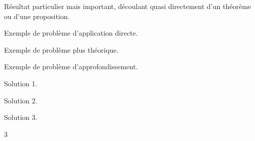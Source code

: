 \begin{corollaire*}
	Résultat particulier mais important, découlant quasi directement d'un théorème ou d'une proposition.
\end{corollaire*}

\begin{Exercise}[label=1, counter=preface]
	Exemple de problème d'application directe.
\end{Exercise}
\begin{Exercise}[difficulty=1, label=2, counter=preface]
	Exemple de problème plus théorique.
\end{Exercise}
\begin{Exercise}[difficulty=2, label=3, counter=preface]
	Exemple de problème d'approfondissement.
\end{Exercise}
\shipoutExercise
\begin{Answer}[ref=1]
	Solution 1.
\end{Answer}
\begin{Answer}[ref=2]
	Solution 2.
\end{Answer}
\begin{Answer}[ref=3]
	Solution 3.
\end{Answer}
\begin{multicols}{3}
\shipoutAnswer
\end{multicols}
